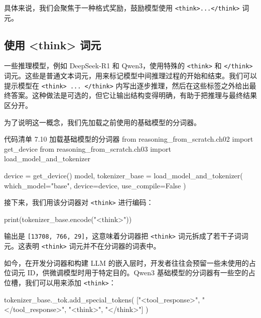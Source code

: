 
具体来说，我们会聚焦于一种格式奖励，鼓励模型使用 \texttt{\textless{}think\textgreater{}...\textless{}/think\textgreater{}} 词元。

\subsection{使用 \textless{}think\textgreater{} 词元}

一些推理模型，例如 DeepSeek-R1 和 Qwen3，使用特殊的 \texttt{\textless{}think\textgreater{}} 和 \texttt{\textless{}/think\textgreater{}} 词元。这些是普通文本词元，用来标记模型中间推理过程的开始和结束。我们可以提示模型在 \texttt{\textless{}think\textgreater{} ... \textless{}/think\textgreater{}} 内写出逐步推理，然后在这些标签之外给出最终答案。这种做法是可选的，但它让输出结构变得明确，有助于把推理与最终结果区分开。

为了说明这一概念，我们先加载之前使用的基础模型的分词器。

\begin{codeboxt}{代码清单 7.10 加载基础模型的分词器}
from reasoning_from_scratch.ch02 import get_device
from reasoning_from_scratch.ch03 import load_model_and_tokenizer

device = get_device()
model, tokenizer_base = load_model_and_tokenizer(
    which_model="base",
    device=device,
    use_compile=False
)
\end{codeboxt}

接下来，我们用该分词器对 \texttt{\textless{}think\textgreater{}} 进行编码：

\begin{codebox}
print(tokenizer_base.encode("<think>"))
\end{codebox}

输出是 \texttt{[13708, 766, 29]}，这意味着分词器把 \texttt{\textless{}think\textgreater{}} 词元拆成了若干子词词元。这表明 \texttt{\textless{}think\textgreater{}} 词元并不在分词器的词表中。

如今，在开发分词器和构建 LLM 的嵌入层时，开发者往往会预留一些未使用的占位词元 ID，供微调模型时用于特定目的。Qwen3 基础模型的分词器有一些空的占位槽，我们可以用来添加 \texttt{\textless{}think\textgreater{}}：

\begin{codebox}
tokenizer_base._tok.add_special_tokens(
  ["<tool_response>", "</tool_response>", "<think>", "</think>"]
)
\end{codebox}

